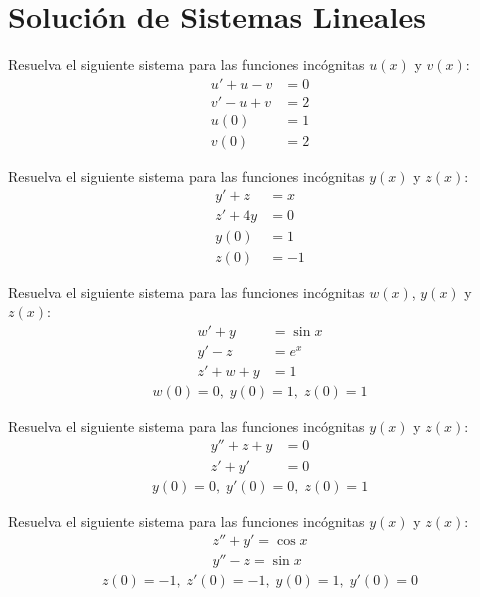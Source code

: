 \section{Solución de Sistemas Lineales}


Resuelva el siguiente sistema para las funciones incógnitas $u(x)$ y $v(x)$:
\begin{align}
u'+u-v &=0\\
v'-u+v &= 2 \\
u(0)&=1\\
v(0)&=2
\end{align}



Resuelva el siguiente sistema para las funciones incógnitas $y(x)$ y $z(x)$:
\begin{align}
y'+z&=x\\
z'+4y &= 0 \\
y(0)&=1\\
z(0)&=-1
\end{align}




Resuelva el siguiente sistema para las funciones incógnitas $w(x)$, $y(x)$ y $z(x)$:
\begin{align}
w'+y&=\sin x\\
y'-z &= e^x\\
z'+w+y&=1
\end{align}
\begin{align}
w(0)=0,\; y(0)=1, \; z(0)=1
\end{align}



Resuelva el siguiente sistema para las funciones incógnitas $y(x)$ y $z(x)$:
\begin{align}
y''+z+y&=0\\
z'+y'&=0
\end{align}
\begin{align}
y(0)=0,\;
y'(0)=0,\;
z(0)=1
\end{align}




Resuelva el siguiente sistema para las funciones incógnitas $y(x)$ y $z(x)$:
\begin{align}
z''+y'=\cos x\\
y''-z=\sin x
\end{align}
\begin{align}
z(0)=-1,\;
z'(0)=-1,\;
y(0)=1,\;
y'(0)=0
\end{align}



